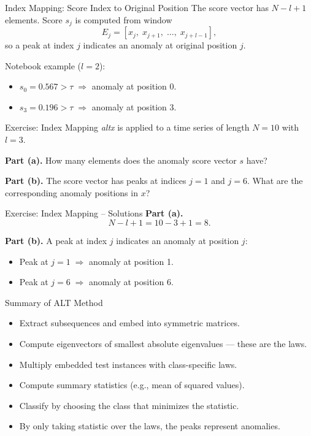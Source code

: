 \documentclass{beamer}
\begin{document}
\begin{frame}{Index Mapping: Score Index to Original Position}
  The score vector has \(N - l + 1\) elements. Score \(s_j\) is computed from window
  \begin{equation}
    E_j = [x_j,\; x_{j+1},\; \dots,\; x_{j+l-1}],
  \end{equation}
  so a peak at index \(j\) indicates an anomaly at original position \(j\).

  Notebook example (\(l = 2\)):
  \begin{itemize}
    \item \(s_0 = 0.567 > \tau \;\Rightarrow\) anomaly at position \(0\). \checkmark
    \item \(s_3 = 0.196 > \tau \;\Rightarrow\) anomaly at position \(3\). \checkmark
  \end{itemize}
\end{frame}

\begin{frame}{Exercise: Index Mapping}
  \emph{altx} is applied to a time series of length \(N = 10\) with \(l = 3\).

  \vspace{0.5em}
  \textbf{Part (a).} How many elements does the anomaly score vector \(s\) have?

  \vspace{0.5em}
  \textbf{Part (b).} The score vector has peaks at indices \(j = 1\) and \(j = 6\).
  What are the corresponding anomaly positions in \(x\)?
\end{frame}

\begin{frame}{Exercise: Index Mapping -- Solutions}
  \textbf{Part (a).}
  \begin{equation}
    N - l + 1 = 10 - 3 + 1 = 8.
  \end{equation}

  \textbf{Part (b).} A peak at index \(j\) indicates an anomaly at position \(j\):
  \begin{itemize}
    \item Peak at \(j = 1 \;\Rightarrow\) anomaly at position 1.
    \item Peak at \(j = 6 \;\Rightarrow\) anomaly at position 6.
  \end{itemize}
\end{frame}

\begin{frame}{Summary of ALT Method}
  \begin{itemize}
    \item Extract subsequences and embed into symmetric matrices.
    \item Compute eigenvectors of smallest absolute eigenvalues — these are the laws.
    \item Multiply embedded test instances with class-specific laws.
    \item Compute summary statistics (e.g., mean of squared values).
    \item Classify by choosing the class that minimizes the statistic.
    \item By only taking statistic over the laws, the peaks represent anomalies.
  \end{itemize}
\end{frame}
\end{document}
